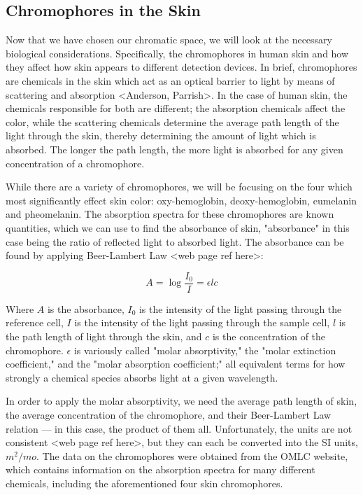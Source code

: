 \subsection{Chromophores in the Skin}

Now that we have chosen our chromatic space, we will look at the necessary biological considerations. Specifically, the chromophores in human skin and how they affect how skin appears to different detection devices. In brief, chromophores are chemicals in the skin which act as an optical barrier to light by means of scattering and absorption <Anderson, Parrish>. In the case of human skin, the chemicals responsible for both are different; the absorption chemicals affect the color, while the scattering chemicals determine the average path length of the light through the skin, thereby determining the amount of light which is absorbed. The longer the path length, the more light is absorbed for any given concentration of a chromophore. 

While there are a variety of chromophores, we will be focusing on the four which most significantly effect skin color: oxy-hemoglobin, deoxy-hemoglobin, eumelanin and pheomelanin. The absorption spectra for these chromophores are known quantities, which we can use to find the absorbance of skin, "absorbance" in this case being the ratio of reflected light to absorbed light. The absorbance can be found by applying Beer-Lambert Law <web page ref here>:

\begin{equation}\label{eq:BeerLambert}
A = \log \frac{I_{0}}{I} = \epsilon l  c 
\end{equation}

Where $A$ is the absorbance, $I_{0}$ is the intensity of the light passing through the reference cell, $I$ is the intensity of the light passing through the sample cell, $l$ is the path length of light through the skin, and $c$ is the concentration of the chromophore. $\epsilon$ is variously called "molar absorptivity," the "molar extinction coefficient," and the "molar absorption coefficient;" all equivalent terms for how strongly a chemical species absorbs light at a given wavelength.

In order to apply the molar absorptivity, we need the average path length of skin, the average concentration of the chromophore, and their Beer-Lambert Law relation --- in this case, the product of them all. Unfortunately, the units are not consistent <web page ref here>, but they can each be converted into the SI units, $m^{2}/mo$. The data on the chromophores were obtained from the OMLC website, which contains information on the absorption spectra for many different chemicals, including the aforementioned four skin chromophores. 

